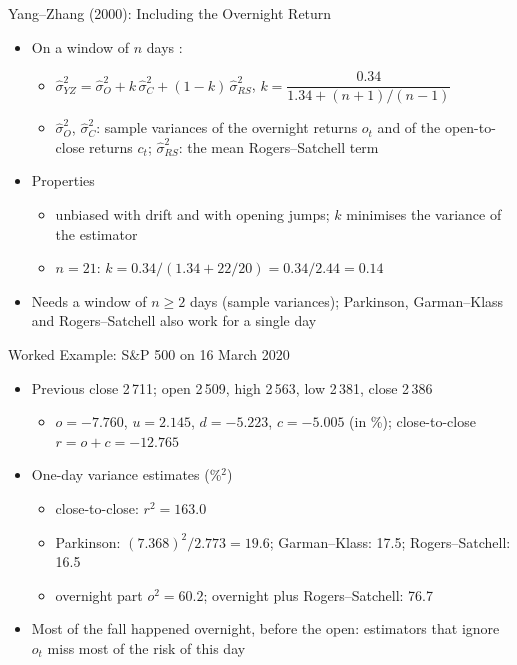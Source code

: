 \begin{frame}{Yang--Zhang (2000): Including the Overnight Return}
\itemsize{\small}
\begin{itemize}
    \item On a window of $n$ days :
    \begin{itemize}
        \item $\hat\sigma_{YZ}^2 = \hat\sigma_O^2 + k\,\hat\sigma_C^2 + (1-k)\,\hat\sigma_{RS}^2$, \quad $k = \dfrac{0.34}{1.34 + (n+1)/(n-1)}$
        \item $\hat\sigma_O^2$, $\hat\sigma_C^2$: sample variances of the overnight returns $o_t$ and of the open-to-close returns $c_t$; $\hat\sigma_{RS}^2$: the mean Rogers--Satchell term
    \end{itemize}
    \item Properties
    \begin{itemize}
        \item unbiased with drift and with opening jumps; $k$ minimises the variance of the estimator
        \item $n = 21$: $k = 0.34/(1.34 + 22/20) = 0.34/2.44 = 0.14$
    \end{itemize}
    \item Needs a window of $n \ge 2$ days (sample variances); Parkinson, Garman--Klass and Rogers--Satchell also work for a single day
\end{itemize}
\end{frame}

\begin{frame}{Worked Example: S\&P 500 on 16 March 2020}
\itemsize{\small}
\begin{itemize}
    \item Previous close 2\,711; open 2\,509, high 2\,563, low 2\,381, close 2\,386
    \begin{itemize}
        \item $o = -7.760$, $u = 2.145$, $d = -5.223$, $c = -5.005$ (in \%); close-to-close $r = o + c = -12.765$
    \end{itemize}
    \item One-day variance estimates (\%$^2$)
    \begin{itemize}
        \item close-to-close: $r^2 = 163.0$
        \item Parkinson: $(7.368)^2/2.773 = 19.6$; Garman--Klass: 17.5; Rogers--Satchell: 16.5
        \item overnight part $o^2 = 60.2$; overnight plus Rogers--Satchell: 76.7
    \end{itemize}
    \item Most of the fall happened overnight, before the open: estimators that ignore $o_t$ miss most of the risk of this day
\end{itemize}
\end{frame}

